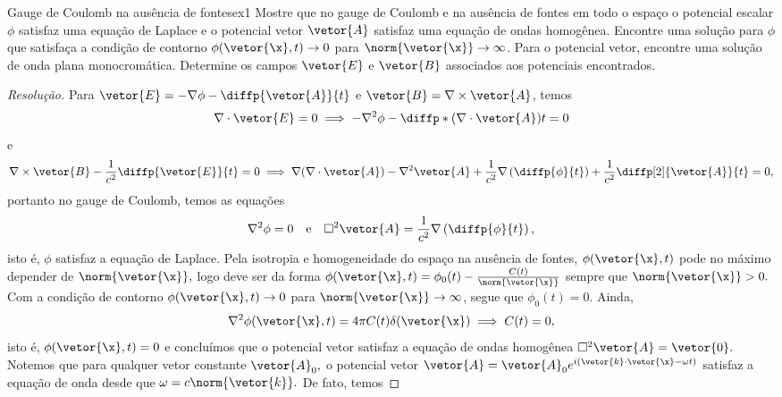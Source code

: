 \begin{exercício}{Gauge de Coulomb na ausência de fontes}{ex1}
   Mostre que no gauge de Coulomb e na ausência de fontes em todo o espaço o potencial escalar \(\phi\) satisfaz uma equação de Laplace e o potencial vetor \(\vetor{A}\) satisfaz uma equação de ondas homogênea. Encontre uma solução para \(\phi\) que satisfaça a condição de contorno \(\phi(\vetor{\x},t) \to 0\) para \(\norm{\vetor{\x}} \to \infty\). Para o potencial vetor, encontre uma solução de onda plana monocromática. Determine os campos \(\vetor{E}\) e \(\vetor{B}\) associados aos potenciais encontrados.
\end{exercício}
\begin{proof}[Resolução]
   Para \(\vetor{E} = - \nabla \phi - \diffp{\vetor{A}}{t}\) e \(\vetor{B} = \nabla \times \vetor{A}\), temos
   \begin{equation*}
      \nabla \cdot \vetor{E} = 0 \implies - \nabla^2 \phi - \diffp*{(\nabla \cdot \vetor{A})}{t} = 0
   \end{equation*}
   e
   \begin{equation*}
      \nabla \times \vetor{B} - \frac{1}{c^2} \diffp{\vetor{E}}{t} = 0 \implies \nabla (\nabla \cdot \vetor{A}) - \nabla^2 \vetor{A} + \frac{1}{c^2} \nabla\left(\diffp{\phi}{t}\right) + \frac{1}{c^2} \diffp[2]{\vetor{A}}{t} = 0,
   \end{equation*}
   portanto no gauge de Coulomb, temos as equações
   \begin{equation*}
      \nabla^2\phi = 0\quad\text{e}\quad \Box^2 \vetor{A} = \frac{1}{c^2} \nabla \left(\diffp{\phi}{t}\right),
   \end{equation*}
   isto é, \(\phi\) satisfaz a equação de Laplace. Pela isotropia e homogeneidade do espaço na ausência de fontes, \(\phi(\vetor{\x}, t)\) pode no máximo depender de \(\norm{\vetor{\x}},\) logo deve ser da forma \(\phi(\vetor{\x},t) = \phi_0(t) - \frac{C(t)}{\norm{\vetor{\x}}}\) sempre que \(\norm{\vetor{\x}} > 0.\) Com a condição de contorno \(\phi(\vetor{\x}, t) \to 0\) para \(\norm{\vetor{\x}}\to \infty\), segue que \(\phi_0(t) = 0.\) Ainda, 
   \begin{equation*}
      \nabla^2 \phi(\vetor{\x},t) = 4\pi C(t) \delta(\vetor{\x}) \implies C(t) = 0,
   \end{equation*}
   isto é, \(\phi(\vetor{\x}, t) = 0\) e concluímos que o potencial vetor satisfaz a equação de ondas homogênea \(\Box^2 \vetor{A} = \vetor{0}.\) Notemos que para qualquer vetor constante \(\vetor{A}_0,\) o potencial vetor \(\vetor{A} = \vetor{A}_0 e^{i(\vetor{k}\cdot \vetor{\x} - \omega t)}\) satisfaz a equação de onda desde que \(\omega = c\norm{\vetor{k}}.\) De fato, temos

\end{proof}
